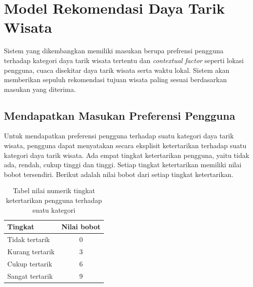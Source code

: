 \section{Model Rekomendasi Daya Tarik Wisata}
Sistem yang dikembangkan memiliki masukan berupa prefrensi pengguna terhadap kategori daya tarik wisata tertentu dan 
\textit{contextual factor} seperti lokasi pengguna, cuaca disekitar daya tarik wisata serta waktu lokal. Sistem akan memberikan sepuluh rekomendasi tujuan wisata
paling sesuai berdasarkan masukan yang diterima.

\subsection{Mendapatkan Masukan Preferensi Pengguna}

Untuk mendapatkan preferensi pengguna terhadap suatu kategori daya tarik wisata, pengguna dapat menyatakan secara eksplisit ketertarikan terhadap suatu kategori daya tarik wisata.
Ada empat tingkat ketertarikan pengguna, yaitu tidak ada, rendah, cukup tinggi dan tinggi. Setiap tingkat ketertarikan memiliki nilai bobot tersendiri. Berikut adalah nilai bobot dari
setiap tingkat ketertarikan.
\begin{table}[h]
\begin{center}
\begin{tabular}{ |l|c| } 
\hline
	\textbf{Tingkat} & \textbf{Nilai bobot}\\
	\hline
	Tidak tertarik & 0 \\
	\hline
	Kurang tertarik & 3 \\
	\hline
	Cukup tertarik & 6\\
	\hline
	Sangat tertarik & 9\\
	\hline
\end{tabular}
\end{center}
\caption{Tabel nilai numerik tingkat ketertarikan pengguna terhadap suatu kategori}
\label{table:weight-pref}
\end{table}

